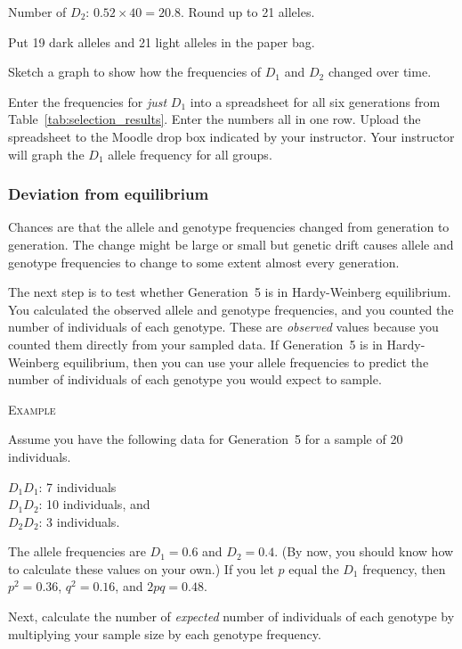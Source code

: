 \documentclass[12pt]{exam}
\newcommand{\allele}[1]{$#1$}
\begin{document}
\begin{questions}
	Number of \allele{D_2}: $0.52 \times 40 = 20.8.$ Round up to 21 alleles.
	
	Put 19 dark alleles and 21 light alleles in the paper bag.


\question
Sketch a graph to show how the frequencies of \allele{D_1} and \allele{D_2} changed over time.

\vspace*{18\baselineskip}


Enter the frequencies for \emph{just} \allele{D_1} into a spreadsheet for all six generations from Table~\ref{tab:selection_results}. Enter the numbers all in one row. Upload the spreadsheet to the Moodle drop box indicated by your instructor. Your instructor will graph the \allele{D_1} allele frequency for all groups.

\subsubsection*{Deviation from equilibrium}

Chances are that the allele and genotype frequencies changed from generation to generation. The change might be large or small but genetic drift causes allele and genotype frequencies to change to some extent almost every generation.

The next step is to test whether Generation~5 is in Hardy-Weinberg equilibrium. You calculated the observed allele and genotype frequencies, and you counted the number of individuals of each genotype. These are \emph{observed} values because you counted them directly from your sampled data.  If Generation~5 is in Hardy-Weinberg equilibrium, then you can use your allele frequencies to predict the number of individuals of each genotype you would expect to sample. \bigskip

\textsc{Example}

\medskip

Assume you have the following data for Generation~5 for a sample of 20 individuals.

$D_1D_1$: 7 individuals  \\
$D_1D_2$: 10 individuals, and\\
$D_2D_2$: 3 individuals.

The allele frequencies are $D_1 = 0.6$ and $D_2 = 0.4$. (By now, you should know how to calculate these values on your own.) If you let $p$ equal the $D_1$ frequency, then $p^2 = 0.36$, $q^2 = 0.16$, and $2pq = 0.48$.

Next, calculate the number of \emph{expected} number of individuals of each genotype by multiplying your sample size by each genotype frequency.


\end{questions}
\end{document}
